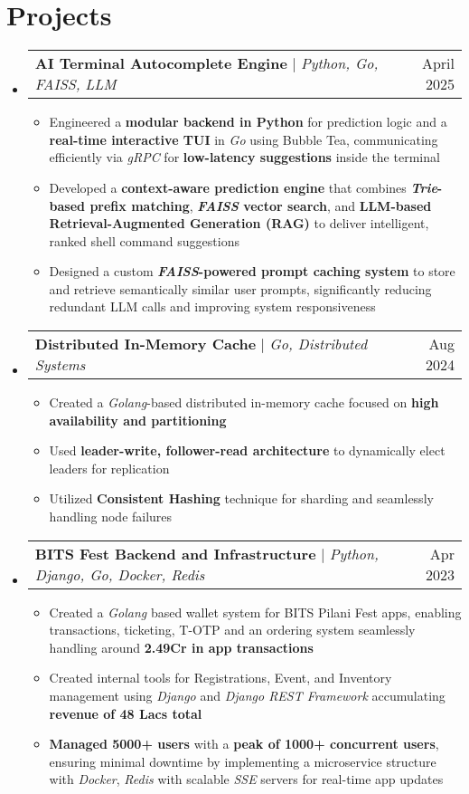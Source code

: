 \documentclass[letterpaper,11pt]{article}
\makeatletter
\newcommand{\resumeItem}[1]{
  \item\small{
    {#1 \vspace{-2pt}}
  }
}
\newcommand{\resumeProjectHeading}[2]{
    \item
    \begin{tabular*}{0.97\textwidth}{l@{\extracolsep{\fill}}r}
      \small#1 & #2 \\
    \end{tabular*}\vspace{-7pt}
}
\newcommand{\resumeSubHeadingListStart}{\begin{itemize}[leftmargin=0.15in, label={}]}
\newcommand{\resumeSubHeadingListEnd}{\end{itemize}}
\newcommand{\resumeItemListStart}{\begin{itemize}}
\newcommand{\resumeItemListEnd}{\end{itemize}\vspace{-5pt}}
\makeatother
\begin{document}
\section{Projects}
    \resumeSubHeadingListStart
      \resumeProjectHeading
          {\textbf{AI Terminal Autocomplete Engine} $|$ \emph{Python, Go, FAISS, LLM}}{April 2025}
          \resumeItemListStart
            \resumeItem{Engineered a \textbf{modular backend in Python} for prediction logic and a \textbf{real-time interactive TUI} in \textit{Go} using Bubble Tea, communicating efficiently via \textit{gRPC} for \textbf{low-latency suggestions} inside the terminal}
            \resumeItem{Developed a \textbf{context-aware prediction engine} that combines \textbf{\textit{Trie}-based prefix matching}, \textbf{\textit{FAISS} vector search}, and \textbf{LLM-based Retrieval-Augmented Generation (RAG)} to deliver intelligent, ranked shell command suggestions}
            \resumeItem{Designed a custom \textbf{\textit{FAISS}-powered prompt caching system} to store and retrieve semantically similar user prompts, significantly reducing redundant LLM calls and improving system responsiveness}
          \resumeItemListEnd
      \resumeProjectHeading
          {\textbf{Distributed In-Memory Cache} $|$ \emph{Go, Distributed Systems}}{Aug 2024}
          \resumeItemListStart
            \resumeItem{Created a \textit{Golang}-based distributed in-memory cache focused on \textbf{high availability and partitioning}}
            \resumeItem{Used \textbf{leader-write, follower-read architecture} to dynamically elect leaders for replication}
            \resumeItem{Utilized \textbf{Consistent Hashing} technique for sharding and seamlessly handling node failures}
          \resumeItemListEnd
      \resumeProjectHeading
          {\textbf{BITS Fest Backend and Infrastructure} $|$ \emph{Python, Django, Go, Docker, Redis}}{Apr 2023}
          \resumeItemListStart
            \resumeItem{Created a \textit{Golang} based wallet system for BITS Pilani Fest apps, enabling transactions, ticketing, T-OTP and an ordering system seamlessly handling around \textbf{2.49Cr in app transactions}}
            \resumeItem{Created internal tools for Registrations, Event, and Inventory management using \textit{Django} and \textit{Django REST Framework} accumulating \textbf{revenue of 48 Lacs total}}
            \resumeItem{\textbf{Managed 5000+ users} with a \textbf{peak of 1000+ concurrent users}, ensuring minimal downtime by implementing a microservice structure with \textit{Docker}, \textit{Redis} with scalable \textit{SSE} servers for real-time app updates}
          \resumeItemListEnd
    \resumeSubHeadingListEnd
\end{document}
